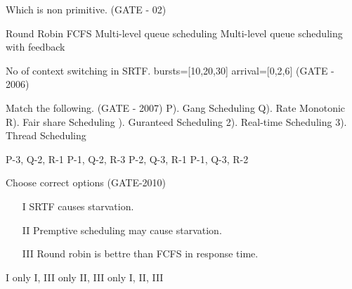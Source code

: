 

\begin{minipage}{\linewidth}

  \question Which is non primitive. (GATE - 02)

  \begin{choices}
    \choice Round Robin
    \choice FCFS
    \choice Multi-level queue scheduling
    \choice Multi-level queue scheduling with feedback
  \end{choices}

\end{minipage}



\begin{minipage}{\linewidth}

  \question No of context switching in SRTF. bursts=[10,20,30] arrival=[0,2,6] (GATE - 2006)

  \begin{oneparchoices}
  \end{oneparchoices}

\end{minipage}



\begin{minipage}{\linewidth}

  \question Match the following. (GATE - 2007) \newline
   P). Gang Scheduling  Q). Rate Monotonic  R). Fair share Scheduling ). Guranteed Scheduling 2). Real-time Scheduling 3). Thread Scheduling
  \begin{choices}
    \choice P-3, Q-2, R-1
    \choice P-1, Q-2, R-3
    \choice P-2, Q-3, R-1
    \choice P-1, Q-3, R-2
  \end{choices}


\end{minipage}


\begin{minipage}{\linewidth}

  \question Choose correct options (GATE-2010)

   \begin{enumerate}
      \item[I] SRTF causes starvation.
      \item[II] Premptive scheduling may cause starvation.
      \item[III] Round robin is bettre than FCFS in response time.
   \end{enumerate}

  \begin{choices}
    \choice I only
    \choice I, III only
    \choice II, III only
    \choice I, II, III
  \end{choices}


\end{minipage}

